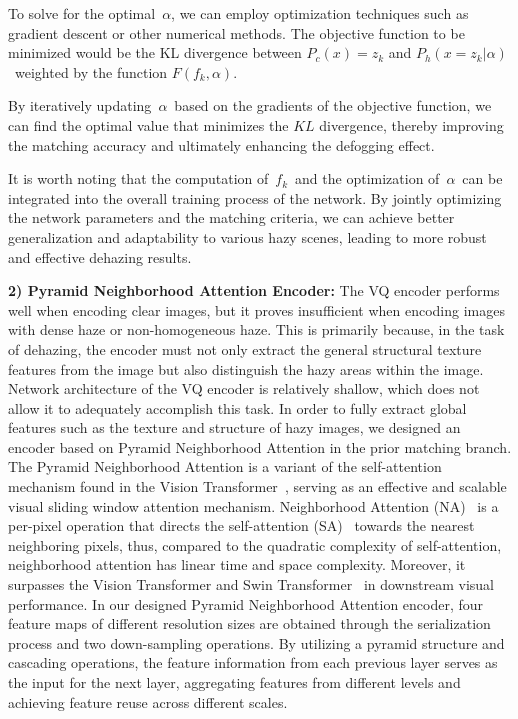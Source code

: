 \documentclass[journal]{IEEEtran}
\begin{document}
To solve for the optimal $\alpha$, we can employ optimization techniques such as gradient descent or other numerical methods. The objective function to be minimized would be the KL divergence between $P_{c}(x) = z_{k}$ and $P_{h}(x = z_{k} | \alpha) $ weighted by  the function $F(f_{k}, \alpha)$.

By iteratively updating $\alpha$ based on the gradients of the objective function, we can find the optimal value that minimizes the $KL$ divergence, thereby improving the matching accuracy and ultimately enhancing the defogging effect.

It is worth noting that the computation of $f_{k}$ and the optimization of $\alpha$ can be integrated into the overall training process of the network. By jointly optimizing the network parameters and the matching criteria, we can achieve better generalization and adaptability to various hazy scenes, leading to more robust and effective dehazing results.

	{\bf{2) Pyramid Neighborhood Attention Encoder:}} The VQ encoder performs well when encoding clear images, but it proves insufficient when encoding images with dense haze or non-homogeneous haze. This is primarily because, in the task of dehazing, the encoder must not only extract the general structural texture features from the image but also distinguish the hazy areas within the image. Network architecture of the VQ encoder is relatively shallow, which does not allow it to adequately accomplish this task. In order to fully extract global features such as the texture and structure of hazy images, we designed an encoder based on Pyramid Neighborhood Attention in the prior matching branch. The Pyramid Neighborhood Attention is a variant of the self-attention mechanism found in the Vision Transformer~\cite{dosovitskiy2020image}, serving as an effective and scalable visual sliding window attention mechanism. Neighborhood Attention (NA)~\cite{hassani2023neighborhood, hassani2022dilated} is a per-pixel operation that directs the self-attention (SA)~\cite{vaswani2017attention} towards the nearest neighboring pixels, thus, compared to the quadratic complexity of self-attention, neighborhood attention has linear time and space complexity. Moreover, it surpasses the Vision Transformer and Swin Transformer~\cite{liu2021swin} in downstream visual performance. In our designed Pyramid Neighborhood Attention encoder, four feature maps of different resolution sizes are obtained through the serialization process and two down-sampling operations. By utilizing a pyramid structure and cascading operations, the feature information from each previous layer serves as the input for the next layer, aggregating features from different levels and achieving feature reuse across different scales.
\end{document}
